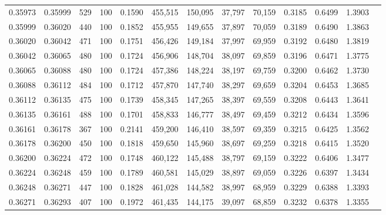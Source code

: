 \begin{tabular}{rrrrrrrrrrrrr}
0.35973 & 0.35999 &    529 & 100 &                                     0.1590 & 455,515 & 150,095 &  37,797 &  70,159 & 0.3185 & 0.6499 & 1.3903 \\
0.35999 & 0.36020 &    440 & 100 &                                     0.1852 & 455,955 & 149,655 &  37,897 &  70,059 & 0.3189 & 0.6490 & 1.3863 \\
0.36020 & 0.36042 &    471 & 100 &                                     0.1751 & 456,426 & 149,184 &  37,997 &  69,959 & 0.3192 & 0.6480 & 1.3819 \\
0.36042 & 0.36065 &    480 & 100 &                                     0.1724 & 456,906 & 148,704 &  38,097 &  69,859 & 0.3196 & 0.6471 & 1.3775 \\
0.36065 & 0.36088 &    480 & 100 &                                     0.1724 & 457,386 & 148,224 &  38,197 &  69,759 & 0.3200 & 0.6462 & 1.3730 \\
0.36088 & 0.36112 &    484 & 100 &                                     0.1712 & 457,870 & 147,740 &  38,297 &  69,659 & 0.3204 & 0.6453 & 1.3685 \\
0.36112 & 0.36135 &    475 & 100 &                                     0.1739 & 458,345 & 147,265 &  38,397 &  69,559 & 0.3208 & 0.6443 & 1.3641 \\
0.36135 & 0.36161 &    488 & 100 &                                     0.1701 & 458,833 & 146,777 &  38,497 &  69,459 & 0.3212 & 0.6434 & 1.3596 \\
0.36161 & 0.36178 &    367 & 100 &                                     0.2141 & 459,200 & 146,410 &  38,597 &  69,359 & 0.3215 & 0.6425 & 1.3562 \\
0.36178 & 0.36200 &    450 & 100 &                                     0.1818 & 459,650 & 145,960 &  38,697 &  69,259 & 0.3218 & 0.6415 & 1.3520 \\
0.36200 & 0.36224 &    472 & 100 &                                     0.1748 & 460,122 & 145,488 &  38,797 &  69,159 & 0.3222 & 0.6406 & 1.3477 \\
0.36224 & 0.36248 &    459 & 100 &                                     0.1789 & 460,581 & 145,029 &  38,897 &  69,059 & 0.3226 & 0.6397 & 1.3434 \\
0.36248 & 0.36271 &    447 & 100 &                                     0.1828 & 461,028 & 144,582 &  38,997 &  68,959 & 0.3229 & 0.6388 & 1.3393 \\
0.36271 & 0.36293 &    407 & 100 &                                     0.1972 & 461,435 & 144,175 &  39,097 &  68,859 & 0.3232 & 0.6378 & 1.3355 \\

\end{tabular}
